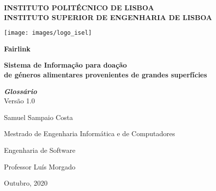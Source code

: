 
\begin{titlepage}
	\begin{center}
		
		\Large\textbf{INSTITUTO POLITÉCNICO DE LISBOA}\\
		\Large\textbf{INSTITUTO SUPERIOR DE ENGENHARIA DE LISBOA}\\

		\vspace{15mm}
		
		\texttt{[image: images/logo\_isel]}\\[1cm]
		
		\vspace{10mm}
		
		\textbf{Fairlink}
	
		\vspace{5mm}
		
		\textbf{\normalsize Sistema de Informação para doação \\ de géneros alimentares provenientes de grandes superfícies }
		
		\vspace{15mm}
		
		\textit{\textbf{Glossário}}
		{{\small \\ Versão 1.0\\}}
		
		\vspace{10mm}
		
		{{\small Samuel Sampaio Costa\\
	
		\vspace{20mm}
		
		\small Mestrado de Engenharia Informática e de Computadores\\
		
		\vspace{5mm}
		
		Engenharia de Software\\
		
		\vspace{30mm}
		
		Professor Luís Morgado}}
		
		\vspace{30mm}
		
		Outubro, 2020
	\end{center}
\end{titlepage}